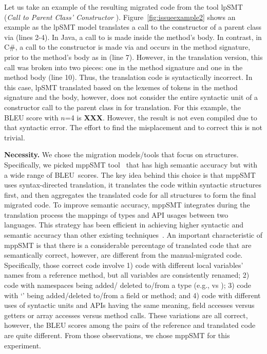 
Let us take an example of the resulting migrated code from the tool
lpSMT~\cite{fse13-nier} ({\em Call to Parent Class' Constructor
  }). Figure~\ref{fig:issueexample2} shows an example
as the lpSMT model translates a call to the constructor of a parent
class via  (lines 2-4). In Java, a call to  is
made inside the method's body. In contrast, in C\#, a call to the
constructor is made via  and occurs in the method
signature, \ie prior to the method's body as in
 (line 7). However, in the translation
version, this call was broken into two pieces: one in the method
signature  and one in the method body  (line 10). Thus, the translation code is
syntactically incorrect. In this case, lpSMT translated based on the
lexemes of tokens in the method signature and the body, however, does
not consider the entire syntactic unit of a constructor call to the
parent class in  for translation. For this example, the
BLEU score with $n$=4 is {\bf XXX}. However, the result is not even
compiled due to that syntactic error. The effort to find the
misplacement and to correct this is not trivial.

{\bf Necessity.} We chose the migration models/tools that focus on
structures. Specifically, we picked mppSMT tool~\cite{ase15} that has
high semantic accuracy but with a wide range of BLEU~scores. The key
idea behind this choice is that mppSMT uses syntax-directed
translation, \ie it translates the code within syntactic structures
first, and then aggregates the translated code for all structures to
form the final migrated code. To improve semantic accuracy, mppSMT
integrates during the translation process the mappings of types and
API usages between two languages. This strategy has been efficient in
achieving higher syntactic and semantic accuracy than other existing
techniques~\cite{ase15}. An important characteristic of mppSMT is that
there is a considerable percentage of translated code that are
semantically correct, however, are different from the manual-migrated
code. Specifically, those correct code involve 1) code with different
local variables' names from a reference method, but all variables are
consistently renamed; 2) code with namespaces being added/ deleted
to/from a type (e.g.,  vs ); 3) code
with `' being added/deleted to/from a field or method; and
4) code with different uses of syntactic units and APIs having the
same meaning, \eg field accesses versus getters or array accesses
versus method calls. These variations are all correct, however, the
BLEU scores among the pairs of the reference and translated code are
quite different.  From those observations, we chose mppSMT for this
experiment.


